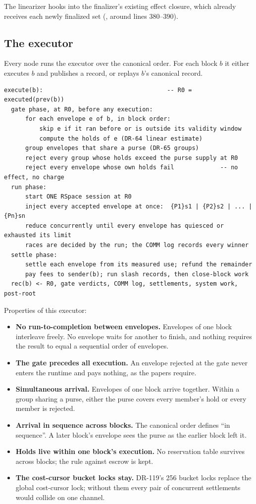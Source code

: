 \documentclass[11pt]{article}
\newcommand{\code}{\path}
\begin{document}
The linearizer hooks into the finalizer's existing effect closure, which already receives each newly finalized set (\code{finalization_runner.rs}, around lines 380--390).

\subsection{The executor}\label{sec:executor}

Every node runs the executor over the canonical order. For each block $b$ it either executes $b$ and publishes a record, or replays $b$'s canonical record.

\begin{Verbatim}[fontsize=\small,frame=single,framesep=6pt]
execute(b):                                   -- R0 = executed(prev(b))
  gate phase, at R0, before any execution:
      for each envelope e of b, in block order:
          skip e if it ran before or is outside its validity window
          compute the holds of e (DR-64 linear estimate)
      group envelopes that share a purse (DR-65 groups)
      reject every group whose holds exceed the purse supply at R0
      reject every envelope whose own holds fail             -- no effect, no charge
  run phase:
      start ONE RSpace session at R0
      inject every accepted envelope at once:  {P1}s1 | {P2}s2 | ... | {Pn}sn
      reduce concurrently until every envelope has quiesced or exhausted its limit
      races are decided by the run; the COMM log records every winner
  settle phase:
      settle each envelope from its measured use; refund the remainder
      pay fees to sender(b); run slash records, then close-block work
  rec(b) <- R0, gate verdicts, COMM log, settlements, system work, post-root
\end{Verbatim}

Properties of this executor:
\begin{itemize}
\item \textbf{No run-to-completion between envelopes.} Envelopes of one block interleave freely. No envelope waits for another to finish, and nothing requires the result to equal a sequential order of envelopes.
\item \textbf{The gate precedes all execution.} An envelope rejected at the gate never enters the runtime and pays nothing, as the papers require.
\item \textbf{Simultaneous arrival.} Envelopes of one block arrive together. Within a group sharing a purse, either the purse covers every member's hold or every member is rejected.
\item \textbf{Arrival in sequence across blocks.} The canonical order defines ``in sequence''. A later block's envelope sees the purse as the earlier block left it.
\item \textbf{Holds live within one block's execution.} No reservation table survives across blocks; the rule against escrow is kept.
\item \textbf{The cost-cursor bucket locks stay.} DR-119's 256 bucket locks replace the global cost-cursor lock; without them every pair of concurrent settlements would collide on one channel.
\end{itemize}
\end{document}
